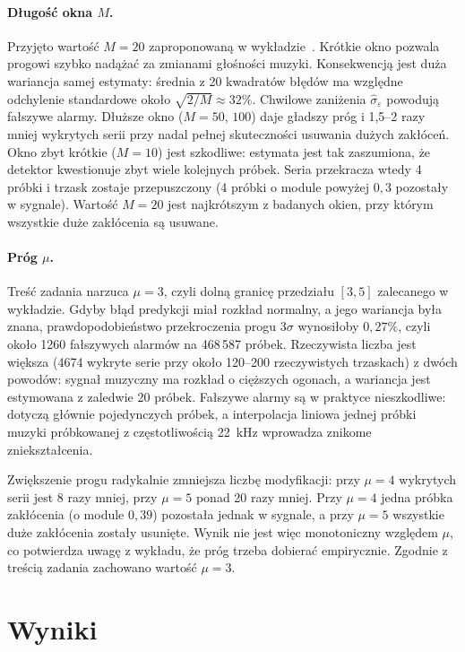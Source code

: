 \documentclass[11pt,a4paper]{article}
\begin{document}
\paragraph{Długość okna $M$.}
Przyjęto wartość $M = 20$ zaproponowaną w wykładzie~\cite{wyklad}. Krótkie
okno pozwala progowi szybko nadążać za zmianami głośności muzyki.
Konsekwencją jest duża wariancja samej estymaty: średnia z 20 kwadratów
błędów ma względne odchylenie standardowe około $\sqrt{2/M} \approx 32\%$.
Chwilowe zaniżenia $\hat\sigma_\varepsilon$ powodują fałszywe alarmy.
Dłuższe okno ($M = 50$, $100$) daje gładszy próg i 1,5--2 razy mniej
wykrytych serii przy nadal pełnej skuteczności usuwania dużych zakłóceń.
Okno zbyt krótkie ($M = 10$) jest szkodliwe: estymata jest tak zaszumiona,
że detektor kwestionuje zbyt wiele kolejnych próbek. Seria przekracza wtedy
4 próbki i trzask zostaje przepuszczony (4 próbki o module powyżej $0{,}3$
pozostały w sygnale). Wartość $M = 20$ jest najkrótszym z badanych okien,
przy którym wszystkie duże zakłócenia są usuwane.

\paragraph{Próg $\mu$.}
Treść zadania narzuca $\mu = 3$, czyli dolną granicę przedziału $[3, 5]$
zalecanego w wykładzie. Gdyby błąd predykcji miał rozkład normalny,
a jego wariancja była znana, prawdopodobieństwo przekroczenia progu
$3\sigma$ wynosiłoby $0{,}27\%$, czyli około 1260 fałszywych alarmów na
468\,587 próbek. Rzeczywista liczba jest większa (4674 wykryte serie przy
około 120--200 rzeczywistych trzaskach) z dwóch powodów: sygnał muzyczny
ma rozkład o cięższych ogonach, a wariancja jest estymowana z zaledwie
20 próbek. Fałszywe alarmy są w praktyce nieszkodliwe: dotyczą głównie
pojedynczych próbek, a interpolacja liniowa jednej próbki muzyki
próbkowanej z częstotliwością 22~kHz wprowadza znikome zniekształcenia.

Zwiększenie progu radykalnie zmniejsza liczbę modyfikacji: przy $\mu = 4$
wykrytych serii jest 8 razy mniej, przy $\mu = 5$ ponad 20 razy mniej.
Przy $\mu = 4$ jedna próbka zakłócenia (o module $0{,}39$) pozostała jednak
w sygnale, a przy $\mu = 5$ wszystkie duże zakłócenia zostały usunięte.
Wynik nie jest więc monotoniczny względem $\mu$, co potwierdza uwagę
z wykładu, że próg trzeba dobierać empirycznie. Zgodnie z treścią zadania
zachowano wartość $\mu = 3$.

\section{Wyniki}
\end{document}
